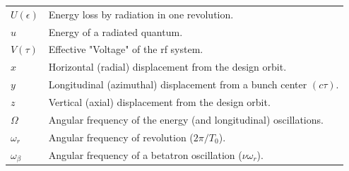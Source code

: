 \documentclass[sands-adaptation.tex]{subfiles}
\begin{document}
\begin{tabularx}{\linewidth}{@{}lX@{}}
	$U(\epsilon)$ & Energy loss by radiation in one revolution.\\
	$u$			& Energy of a radiated quantum.\\
	$V(\tau)$	& Effective "Voltage" of the rf system.\\
	$x$			& Horizontal (radial) displacement from the design orbit.\\
	$y$			& Longitudinal (azimuthal) displacement from a bunch center $(c\tau)$.\\
    $z$			& Vertical (axial) displacement from the design orbit.\\
    $\Omega$	& Angular frequency of the energy (and longitudinal) oscillations.\\
    $\omega_r$	& Angular frequency of revolution ($2\pi/T_0$).\\
	$\omega_\beta$ & Angular frequency of a betatron oscillation ($\nu\omega_r$).
\end{tabularx}
\end{document}
